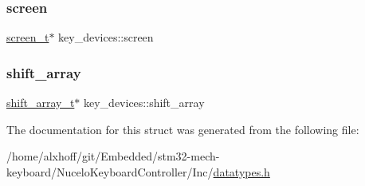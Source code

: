 \mbox{\label{structkey__devices_aa7d66258cb8699504a5b7b5ca79312a2}} 
\subsubsection{\texorpdfstring{screen}{screen}}
{\footnotesize\ttfamily \hyperlink{datatypes_8h_a2b884fb4031189ae0bf89d344e558973}{screen\+\_\+t}$\ast$ key\+\_\+devices\+::screen}

\mbox{\label{structkey__devices_a2d89c37a95b62f18c39802dcd775849a}} 
\subsubsection{\texorpdfstring{shift\+\_\+array}{shift\_array}}
{\footnotesize\ttfamily \hyperlink{datatypes_8h_adb530ee69b7a28ad91cf00a7c665a2f5}{shift\+\_\+array\+\_\+t}$\ast$ key\+\_\+devices\+::shift\+\_\+array}



The documentation for this struct was generated from the following file\+:\begin{DoxyCompactItemize}
\item 
/home/alxhoff/git/\+Embedded/stm32-\/mech-\/keyboard/\+Nucelo\+Keyboard\+Controller/\+Inc/\hyperlink{datatypes_8h}{datatypes.\+h}\end{DoxyCompactItemize}

